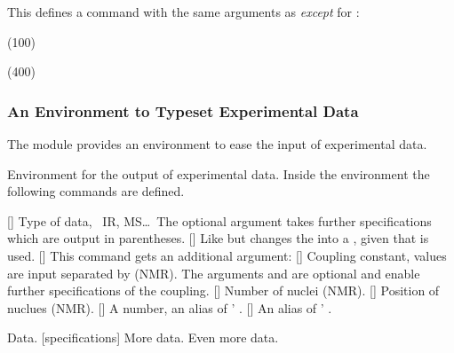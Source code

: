 \documentclass{chemmacros-manual}
\makeatletter
\def\chemmodule*#1{\textquotedblleft#1\textquotedblright}%
\renewenvironment{commands}
  {%
    \let\command\cnltx@command
    \let\explcommand\cnltx@explcommand
    \cnltxlist
  }
  {\endcnltxlist}
\makeatother
\begin{document}
This defines a command with the same arguments as  \emph{except} for
:
\begin{example}
  \NewChemNMR{}%
  \NewChemNMR{}%
  \CNMR*(100) \par
  \HNMR*(400)
\end{example}

\subsubsection{An Environment to Typeset Experimental Data}

The  module provides an environment to ease the input
of experimental data.
\begin{environments}
    Environment for the output of experimental data.  Inside the environment
    the following commands are defined.
\end{environments}
\begin{commands}
  \command{data}[]
    Type of data, \eg\ IR, MS\ldots\  The optional argument takes further
    specifications which are output in parentheses.
  \command{data}[\sarg{}]
    Like  but changes the \code{=} into a \code{:}, given that
     is used.
  \command{NMR}[]
    This command gets an additional argument:
     
  \command{J}[]
    Coupling constant, values are input separated by \code{;} (NMR).  The
    arguments  and  are optional
    and enable further specifications of the coupling.
  \command{\#}[]
    Number of nuclei (NMR).
  \command{pos}[]
    Position of nuclues (NMR).
  \command{val}[]
    A number, an alias of ' .
  \command{val}[]
    An alias of ' .
\end{commands}

\begin{example}
  \begin{experimental}
     Data.
    [specifications] More data.
     Even more data.
  \end{experimental}
\end{example}
\end{document}
